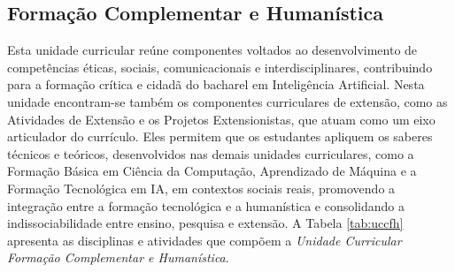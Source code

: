 \subsection{Formação Complementar e Humanística}

Esta unidade curricular reúne componentes voltados ao desenvolvimento de competências éticas, sociais, comunicacionais e interdisciplinares, contribuindo para a formação crítica e cidadã do bacharel em Inteligência Artificial. 
Nesta unidade encontram-se também os componentes curriculares de extensão, como as Atividades de Extensão e os Projetos Extensionistas, que atuam como um eixo articulador do currículo. Eles permitem que os estudantes apliquem os saberes técnicos e teóricos, desenvolvidos nas demais unidades curriculares, como a Formação Básica em Ciência da Computação, Aprendizado de Máquina e a Formação Tecnológica em IA, em contextos sociais reais, promovendo a integração entre a formação tecnológica e a humanística e consolidando a indissociabilidade entre ensino, pesquisa e extensão. 
A Tabela \ref{tab:uccfh} apresenta as disciplinas e atividades que compõem a \textit{Unidade Curricular Formação Complementar e Humanística}.

